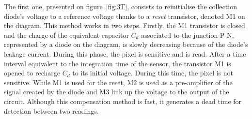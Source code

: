     The first one, presented on figure~\ref{fig:3T}, consists to reinitialise the collection diode's voltage to a reference voltage thanks to a \textit{reset} transistor, denoted M1 on the diagram.
    This method works in two steps. 
    Firstly, the M1 transistor is closed and the charge of the equivalent capacitor $C_d$ associated to the junction P-N, represented by a diode on the diagram, is slowly decreasing because of the diode's leakage current. 
    During this phase, the pixel is sensitive and is read.
    After a time interval equivalent to the integration time of the sensor, the transistor M1 is opened to recharge $C_d$ to its initial voltage.
    During this time, the pixel is not sensitive.
    While M1 is used for the reset, M2 is used as a pre-amplifier of the signal created by the diode and M3 link up the voltage to the output of the circuit.
    Although this compensation method is fast, it generates a dead time for detection between two readings.
    
    
